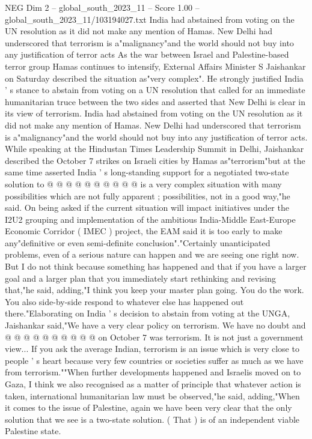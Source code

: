 \begin{textsample}{NEG Dim 2 – global\_south\_2023\_11 – Score 1.00 – global\_south\_2023\_11/103194027.txt}  \label{ex:f2_neg_231}
India had abstained from voting on the UN resolution as it did not make any mention of Hamas.
New Delhi had underscored that terrorism is a"malignancy"and the world should not buy into any justification of terror acts As the war between Israel and Palestine-based terror group Hamas continues to intensify, External Affairs Minister S Jaishankar on Saturday described the situation as"very complex".
He strongly justified India ' s stance to abstain from voting on a UN resolution that called for an immediate humanitarian truce between the two sides and asserted that New Delhi is clear in its view of terrorism.
India had abstained from voting on the UN resolution as it did not make any mention of Hamas.
New Delhi had underscored that terrorism is a"malignancy"and the world should not buy into any justification of terror acts.
While speaking at the Hindustan Times Leadership Summit in Delhi, Jaishankar described the October 7 strikes on Israeli cities by Hamas as"terrorism"but at the same time asserted India ' s long-standing support for a negotiated two-state solution to @ @ @ @ @ @ @ @ @ @ is a very complex situation with many possibilities which are not fully apparent ; possibilities, not in a good way,"he said.
On being asked if the current situation will impact initiatives under the I2U2 grouping and implementation of the ambitious India-Middle East-Europe Economic Corridor ( IMEC ) project, the EAM said it is too early to make any"definitive or even semi-definite conclusion"."Certainly unanticipated problems, even of a serious nature can happen and we are seeing one right now.
But I do not think because something has happened and that if you have a larger goal and a larger plan that you immediately start rethinking and revising that,"he said, adding,"I think you keep your master plan going.
You do the work.
You also side-by-side respond to whatever else has happened out there."Elaborating on India ' s decision to abstain from voting at the UNGA, Jaishankar said,"We have a very clear policy on terrorism.
We have no doubt and @ @ @ @ @ @ @ @ @ @ on October 7 was terrorism.
It is not just a government view...
If you ask the average Indian, terrorism is an issue which is very close to people ' s heart because very few countries or societies suffer as much as we have from terrorism.""When further developments happened and Israelis moved on to Gaza, I think we also recognised as a matter of principle that whatever action is taken, international humanitarian law must be observed,"he said, adding,"When it comes to the issue of Palestine, again we have been very clear that the only solution that we see is a two-state solution. ( That ) is of an independent viable Palestine state.

\end{textsample}
